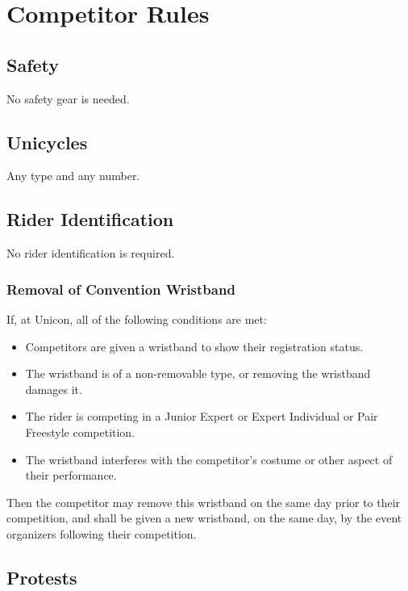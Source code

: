 \chapter{Competitor Rules}

\section{Safety}

No safety gear is needed.

\section{Unicycles}

Any type and any number.

\section{Rider Identification}

No rider identification is required.%

\subsection{Removal of Convention Wristband}

If, at Unicon, all of the following conditions are met:
\begin{itemize}
\item Competitors are given a wristband to show their registration status.
\item The wristband is of a non-removable type, or removing the wristband damages it.
\item The rider is competing in a Junior Expert or Expert Individual or Pair Freestyle competition.
\item The wristband interferes with the competitor's costume or other aspect of their performance.
\end{itemize}

Then the competitor may remove this wristband on the same day prior to their competition, and shall be given a new wristband, on the same day, by the event organizers following their competition.

\section{Protests}

